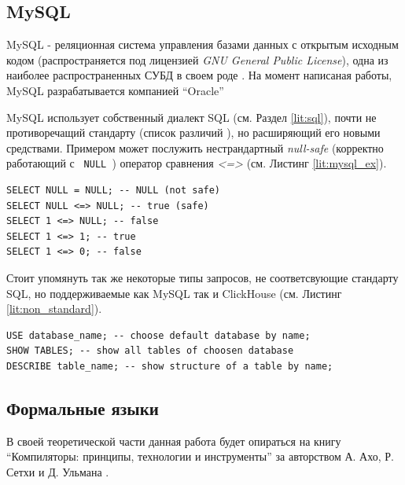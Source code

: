 \subsection{MySQL} \label{lit:mysql}
MySQL - реляционная система управления базами данных с открытым исходным кодом (распространяется под лицензией \textit{GNU General Public License}), одна из наиболее распространенных СУБД в своем роде \cite{mysql_ref}. На момент написаная работы, MySQL разрабатывается компанией \enquote{Oracle} 

MySQL использует собственный диалект SQL (см. Раздел \ref{lit:sql}), почти не противоречащий стандарту (список различий \cite{mysql_vs_sql}\cite{mysql_vs_sql2}), но расширяющий его новыми средствами. Примером может послужить нестрандартный \textit{null-safe} (корректно работающий с \texttt{ NULL }) оператор сравнения \textit{<=>} (см. Листинг \ref{lit:mysql_ex}).

\begin{code}
    \label{lit:mysql_ex}
    \begin{verbatim}
SELECT NULL = NULL; -- NULL (not safe)
SELECT NULL <=> NULL; -- true (safe)
SELECT 1 <=> NULL; -- false
SELECT 1 <=> 1; -- true
SELECT 1 <=> 0; -- false
    \end{verbatim}
\end{code}

Стоит упомянуть так же некоторые типы запросов, не соответсвующие стандарту SQL, но поддерживаемые как MySQL так и ClickHouse (см. Листинг \ref{lit:non_standard}).

\begin{code}
    \label{lit:non_standard}
    \begin{verbatim}
USE database_name; -- choose default database by name;
SHOW TABLES; -- show all tables of choosen database
DESCRIBE table_name; -- show structure of a table by name;
    \end{verbatim}
\end{code}


\subsection{Формальные языки}
В своей теоретической части данная работа будет опираться на книгу \enquote{Компиляторы: принципы, технологии и инструменты} за авторством А. Ахо, Р. Сетхи и Д. Ульмана \cite{dragon}.

